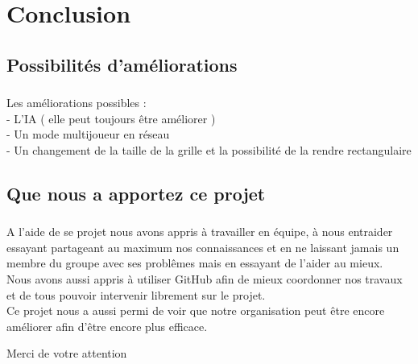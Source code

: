\documentclass{beamer}
\begin{document}
\section{Conclusion}
\subsection{Possibilités d'améliorations}
\begin{frame}
\frametitle{\insertsubsection}
\framesubtitle{\insertsection}
Les améliorations possibles :\\
\indent - L'IA ( elle peut toujours être améliorer )\\
\indent - Un mode multijoueur en réseau\\
\indent - Un changement de la taille de la grille et la possibilité de la rendre rectangulaire

\end{frame}
\subsection{Que nous a apportez ce projet}
\begin{frame}
\frametitle{\insertsubsection}
\framesubtitle{\insertsection}
A l'aide de se projet nous avons appris à travailler en équipe, à nous entraider essayant partageant au maximum nos connaissances et en ne laissant jamais un membre du groupe avec ses problêmes mais en essayant de l'aider au mieux.\\
Nous avons aussi appris à utiliser GitHub afin de mieux coordonner nos travaux et de tous pouvoir intervenir librement sur le projet.\\
Ce projet nous a aussi permi de voir que notre organisation peut être encore améliorer afin d'être encore plus efficace.

\end{frame}

\begin{frame}
\begin{center}
	Merci de votre attention
\end{center}
\end{frame}
\end{document}
